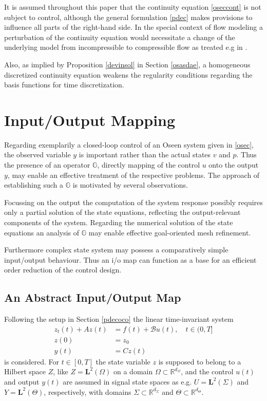 \documentclass[a4paper,10pt,BCOR=15mm]{scrbook}
\begin{document}
\begin{rem}
It is assumed throughout this paper that the continuity equation \eqref{oseccont} is not subject to control, although the general formulation \eqref{pdec} makes provisions to influence all parts of the right-hand side. In the special context of flow modeling a perturbation of the continuity equation would necessitate a change of the underlying model from incompressible to compressible flow as treated e.g in \cite{feirei}. 

Also, as implied by Proposition \ref{devinsol} in Section \ref{osasdae}, a homogeneous discretized continuity equation weakens the regularity conditions regarding the basis functions for time discretization.
\end{rem}




\section{Input/Output Mapping}

Regarding exemplarily a closed-loop control of an Oseen system given in \eqref{osec}, the observed variable $y$ is important rather than the actual states $v$ and $p$. Thus the presence of an operator $\mathbb G$, directly mapping of the control $u$ onto the output $y$, may enable an effective treatment of the respective problems. The approach of establishing such a $\mathbb G$ is motivated by several observations.

Focussing on the output the computation of the system response possibly requires only a partial solution of the state equations, reflecting the output-relevant components of the system. Regarding the numerical solution of the state equations an analysis of $\mathbb G$ may enable effective goal-oriented mesh refinement.

Furthermore complex state system may possess a comparatively simple input/output behaviour. Thus an i/o map can function as a base for an efficient order reduction of the control design.

\subsection{An Abstract Input/Output Map}\label{fafra}
Following the setup in Section \ref{pdecoco} the linear time-invariant system
\begin{subequations}\label{pdesys1}
\begin{align}
 z_t(t) + Az(t) &=  f(t)+ \mathcal Bu(t) , \quad  t \in  (0,T]\\
z(0) &= z_0 \\
 y(t) &= Cz(t) 
\end{align}
\end{subequations}
is considered. For $t\in [0,T]$ the state variable $z$ is supposed to belong to a Hilbert space $Z$, like $Z=\mathbf L^2(\Omega)$ on a domain $\Omega \subset \mathbb R^{d_\Omega}$, and the control $u(t)$ and output $y(t)$ are assumed in signal state spaces as e.g. $U = \mathbf L^2(\Sigma)$ and $Y = \mathbf L^2(\Theta)$, respectively, with domains $\Sigma \subset \mathbb R^{d_\Sigma}$ and $\Theta \subset \mathbb R^{d_\Theta}$. 
\end{document}
